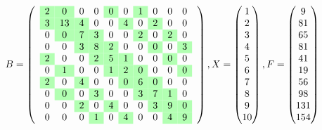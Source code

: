 $$ B=\left(\quad\begin{matrix}
\cellcolor{green!30}2 & \cellcolor{green!30}0 & 0 & 0 & \cellcolor{green!30}0 & 0 & \cellcolor{green!30}1 & 0 & 0 & 0 \\
\cellcolor{green!30}3 & \cellcolor{green!30}13 & \cellcolor{green!30}4 & 0 & 0 & \cellcolor{green!30}4 & 0 & \cellcolor{green!30}2 & 0 & 0 \\
0 & \cellcolor{green!30}0 & \cellcolor{green!30}7 & \cellcolor{green!30}3 & 0 & 0 & \cellcolor{green!30}2 & 0 & \cellcolor{green!30}2 & 0 \\
0 & 0 & \cellcolor{green!30}3 & \cellcolor{green!30}8 & \cellcolor{green!30}2 & 0 & 0 & \cellcolor{green!30}0 & 0 & \cellcolor{green!30}3 \\
\cellcolor{green!30}2 & 0 & 0 & \cellcolor{green!30}2 & \cellcolor{green!30}5 & \cellcolor{green!30}1 & 0 & 0 & \cellcolor{green!30}0 & 0 \\
0 & \cellcolor{green!30}1 & 0 & 0 & \cellcolor{green!30}1 & \cellcolor{green!30}2 & \cellcolor{green!30}0 & 0 & 0 & \cellcolor{green!30}0 \\
\cellcolor{green!30}2 & 0 & \cellcolor{green!30}4 & 0 & 0 & \cellcolor{green!30}0 & \cellcolor{green!30}6 & \cellcolor{green!30}0 & 0 & 0 \\
0 & \cellcolor{green!30}0 & 0 & \cellcolor{green!30}3 & 0 & 0 & \cellcolor{green!30}3 & \cellcolor{green!30}7 & \cellcolor{green!30}1 & 0 \\
0 & 0 & \cellcolor{green!30}2 & 0 & \cellcolor{green!30}4 & 0 & 0 & \cellcolor{green!30}3 & \cellcolor{green!30}9 & \cellcolor{green!30}0 \\
0 & 0 & 0 & \cellcolor{green!30}1 & 0 & \cellcolor{green!30}4 & 0 & 0 & \cellcolor{green!30}4 & \cellcolor{green!30}9 
\end{matrix}\quad\right), X=\begin{pmatrix}1 \\
2 \\
3 \\
4 \\
5 \\
6 \\
7 \\
8 \\
9 \\
10 
\end{pmatrix}, F=\begin{pmatrix}9 \\
81 \\
65 \\
81 \\
41 \\
19 \\
56 \\
98 \\
131 \\
154 
\end{pmatrix} $$

